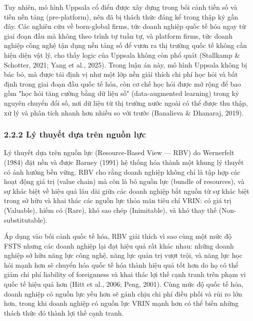 \documentclass[12pt,a4paper]{article}
\begin{document}
Tuy nhiên, mô hình Uppsala cổ điển được xây dựng trong bối cảnh tiền số
và tiền nền tảng (pre-platform), nên đã bị thách thức đáng kể trong thập
kỷ gần đây. Các nghiên cứu về born-global firms, tức doanh nghiệp quốc
tế hóa ngay từ giai đoạn đầu mà không theo trình tự tuần tự, và platform
firms, tức doanh nghiệp công nghệ tận dụng nền tảng số để vươn ra thị
trường quốc tế không cần hiện diện vật lý, cho thấy logic của Uppsala
không còn phổ quát (Stallkamp \& Schotter, 2021; Yang et al., 2025).
Trong luận án này, mô hình Uppsala không bị bác bỏ, mà được tái định vị
như một lớp nền giải thích chi phí học hỏi và bất định trong giai đoạn
đầu quốc tế hóa, còn cơ chế học hỏi được mở rộng để bao gồm "học hỏi
tăng cường bằng dữ liệu số" (data-augmented learning) trong kỷ nguyên
chuyển đổi số, nơi dữ liệu từ thị trường nước ngoài có thể được thu
thập, xử lý và phân tích nhanh hơn nhiều so với trước (Banalieva \&
Dhanaraj, 2019).

\hypertarget{222-luxfd-thuyux1ebft-dux1ef1a-truxean-nguux1ed3n-lux1ef1c}{%
\subsubsection{2.2.2 Lý thuyết dựa trên nguồn
lực}\label{222-luxfd-thuyux1ebft-dux1ef1a-truxean-nguux1ed3n-lux1ef1c}}

Lý thuyết dựa trên nguồn lực (Resource-Based View --- RBV) do Wernerfelt
(1984) đặt nền và được Barney (1991) hệ thống hóa thành một khung lý
thuyết có ảnh hưởng bền vững. RBV cho rằng doanh nghiệp không chỉ là tập
hợp các hoạt động giá trị (value chain) mà còn là bó nguồn lực (bundle
of resources), và sự khác biệt về hiệu quả lâu dài giữa các doanh nghiệp
bắt nguồn từ sự khác biệt trong sở hữu và khai thác các nguồn lực thỏa
mãn tiêu chí VRIN: có giá trị (Valuable), hiếm có (Rare), khó sao chép
(Inimitable), và khó thay thế (Non-substitutable).

Áp dụng vào bối cảnh quốc tế hóa, RBV giải thích vì sao cùng một mức độ
FSTS nhưng các doanh nghiệp lại đạt hiệu quả rất khác nhau: những doanh
nghiệp sở hữu năng lực công nghệ, năng lực quản trị vượt trội, và năng
lực học hỏi mạnh hơn sẽ chuyển hóa quốc tế hóa thành hiệu quả tốt hơn do
họ có thể giảm chi phí liability of foreignness và khai thác lợi thế
cạnh tranh trên phạm vi quốc tế hiệu quả hơn (Hitt et al., 2006; Peng,
2001). Cùng mức độ quốc tế hóa, doanh nghiệp có nguồn lực yếu hơn sẽ
gánh chịu chi phí điều phối và rủi ro lớn hơn, trong khi doanh nghiệp có
nguồn lực VRIN mạnh hơn có thể biến những thách thức đó thành lợi thế
cạnh tranh.
\end{document}
